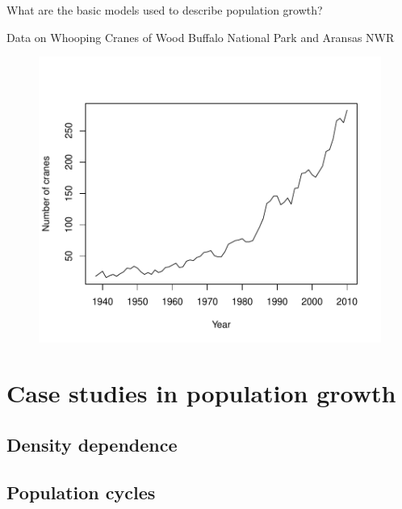\begin{frame}
    \begin{adjustwidth}{-2em}{-1.5em}
        \vspace{-1mm}
        What are the basic models used to describe population growth?

        \vspace{2mm}
        Data on Whooping Cranes of Wood Buffalo National Park and Aransas NWR

        \vspace{-1.1cm}
        \begin{figure}
        \begin{center}
            \includegraphics[width=0.75\linewidth]{crane-growth.pdf}
        \end{center}
        \end{figure}

        \vspace{-8mm}
    \end{adjustwidth}
\end{frame}
\section{Case studies in population growth}

\subsection{Density dependence}

\subsection{Population cycles}



